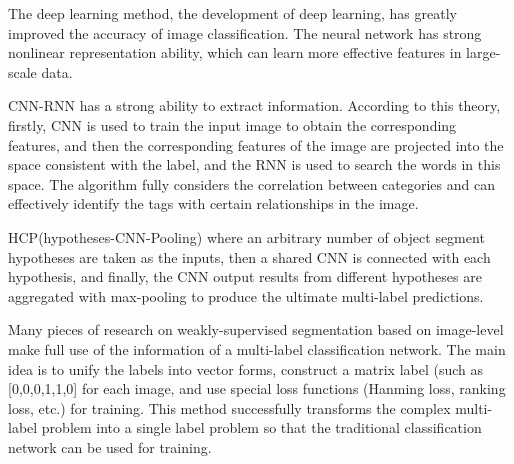\documentclass[10pt,twocolumn,letterpaper]{article}
\begin{document}
The deep learning method, the development of deep learning, has greatly improved the accuracy of image classification. The neural network has strong nonlinear representation ability, which can learn more effective features in large-scale data.\par

CNN-RNN\cite{Wang_2016_CVPR} has a strong ability to extract information. According to this theory, firstly, CNN is used to train the input image to obtain the corresponding features, and then the corresponding features of the image are projected into the space consistent with the label, and the RNN is used to search the words in this space. The algorithm fully considers the correlation between categories and can effectively identify the tags with certain relationships in the image.
\par
HCP(hypotheses-CNN-Pooling)\cite{7305792} where an arbitrary number of object segment hypotheses are taken as the inputs, then a shared CNN is connected with each hypothesis, and finally, the CNN output results from different hypotheses are aggregated with max-pooling to produce the ultimate multi-label predictions.\par

Many pieces of research on weakly-supervised segmentation based on image-level make full use of the information of a multi-label classification network. The main idea is to unify the labels into vector forms, construct a matrix label (such as [0,0,0,1,1,0] for each image, and use special loss functions (Hanming loss, ranking loss, etc.) for training. This method successfully transforms the complex multi-label problem into a single label problem so that the traditional classification network can be used for training.



\end{document}
